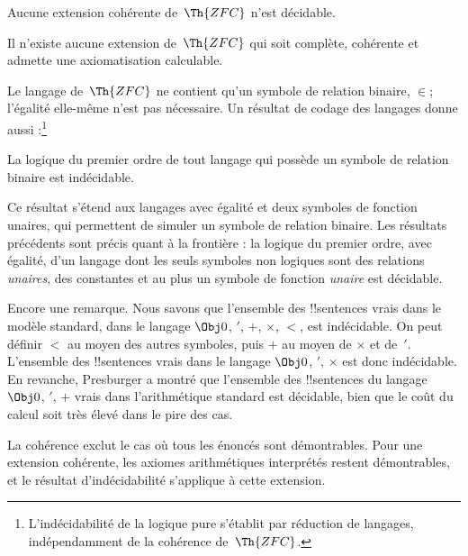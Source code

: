 \documentclass[../../../include/open-logic-section]{subfiles}
\begin{document}
\begin{cor}
Aucune extension cohérente de~$\Th{ZFC}$ n'est
décidable.
\end{cor}

\begin{cor}
Il n'existe aucune extension de~$\Th{ZFC}$ qui soit
complète, cohérente et admette une axiomatisation
calculable.
\end{cor}

Le langage de~$\Th{ZFC}$ ne contient qu'un symbole
de relation binaire, $\in$; l'égalité elle-même
n'est pas nécessaire. Un résultat de codage des langages donne aussi :\footnote{L'indécidabilité de la logique pure s'établit par réduction de langages, indépendamment de la cohérence de~$\Th{ZFC}$.}

\begin{cor}
La logique du premier ordre de tout langage qui
possède un symbole de relation binaire est
indécidable.
\end{cor}

Ce résultat s'étend aux langages avec égalité et deux symboles
de fonction unaires, qui permettent de simuler un
symbole de relation binaire. Les résultats précédents
sont précis quant à la frontière : la logique du
premier ordre, avec égalité, d'un langage dont les seuls symboles non logiques sont
des relations \emph{unaires}, des constantes et au plus un symbole de
fonction \emph{unaire} est décidable.

Encore une remarque. Nous savons que l'ensemble des
!!{sentence}s vrais dans le modèle standard, dans
le langage $\Obj 0$, $'$, $+$, $\times$, $<$,
est indécidable. On peut définir $<$ au moyen des
autres symboles, puis $+$ au moyen de $\times$ et
de~$'$. L'ensemble des !!{sentence}s vrais dans
le langage $\Obj 0$, $'$, $\times$ est donc
indécidable. En revanche, Presburger a montré que
l'ensemble des !!{sentence}s du langage $\Obj 0$,
$'$, $+$ vrais dans l'arithmétique standard est
décidable, bien que le coût du calcul soit très élevé
dans le pire des cas.

\begin{explain}
La cohérence exclut le cas où tous les énoncés sont
démontrables. Pour une extension cohérente, les axiomes
arithmétiques interprétés restent démontrables, et le résultat
d'indécidabilité s'applique à cette extension.
\end{explain}
\end{document}

